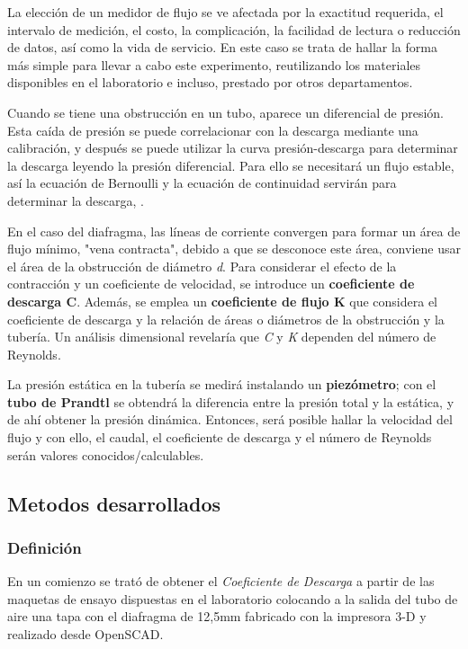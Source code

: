 La elección de un medidor de flujo se ve afectada por la exactitud
requerida, el intervalo de medición, el costo, la complicación, la
facilidad de lectura o reducción de datos, así como la vida de servicio.
En este caso se trata de hallar la forma más simple para llevar a cabo este
experimento, reutilizando los materiales disponibles en el laboratorio e
incluso, prestado por otros departamentos.

Cuando se tiene una obstrucción en un tubo, aparece un diferencial de
presión. Esta caída de presión se puede correlacionar con la descarga
mediante una calibración, y después se puede utilizar la curva
presión-descarga para determinar la descarga leyendo la presión
diferencial. Para ello se necesitará un flujo estable, así la ecuación
de Bernoulli y la ecuación de continuidad servirán para determinar la
descarga, \cite{Mataix82}.

En el caso del diafragma, las líneas de corriente convergen para formar
un área de flujo mínimo, "vena contracta", debido a que se desconoce
este área, conviene usar el área de la obstrucción de diámetro \emph{d}.
Para considerar el efecto de la contracción y un coeficiente de
velocidad, se introduce un \textbf{coeficiente de descarga C}. Además,
se emplea un \textbf{coeficiente de flujo K} que considera el
coeficiente de descarga y la relación de áreas o diámetros de la
obstrucción y la tubería. Un análisis dimensional revelaría que \emph{C}
y \emph{K} dependen del número de Reynolds.

La presión estática en la tubería se medirá instalando un
\textbf{piezómetro}; con el \textbf{tubo de Prandtl} se obtendrá la
diferencia entre la presión total y la estática, y de ahí obtener la
presión dinámica. Entonces, será posible hallar la velocidad del flujo y
con ello, el caudal, el coeficiente de descarga y el número de Reynolds
serán valores conocidos/calculables.

\subsection{Metodos desarrollados}\label{header-n257}

\subsubsection{Definición}\label{header-n258}

En un comienzo se trató de obtener el \emph{Coeficiente de Descarga} a
partir de las maquetas de ensayo dispuestas en el laboratorio colocando
a la salida del tubo de aire una tapa con el diafragma de 12,5mm
fabricado con la impresora 3-D y realizado desde OpenSCAD.


